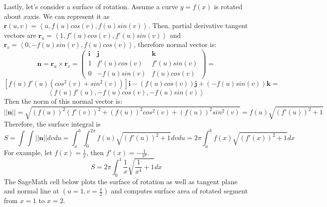 Lastly, let's consider a surface of rotation.   Assume a curve $y=f(x)$ is rotated about $x$\-axis.  We can represent it as $\mathbf{r}(u,v) = \left< u, f(u)cos(v), f(u)sin(v) \right>$.  
Then, partial derivative tangent vectors are $\mathbf{r}_u = \left< 1, f'(u)cos(v), f'(u)sin(v)  \right>$ and $\mathbf{r}_v = \left< 0, -f(u)sin(v), f(u)cos(v) \right>$, therefore normal vector is:
$$ \mathbf{n} = \mathbf{r}_u \times \mathbf{r}_v = \begin{pmatrix}
\mathbf{i} & \mathbf{j} & \mathbf{k}\\
1 & f'(u)cos(v) & f'(u)sin(v) \\
0 & -f(u)sin(v) & f(u)cos(v)
\end{pmatrix} = $$
$$[f(u)f'(u)(cos^2(v)+sin^2(v))] \mathbf{i}-(f(u)cos(v)) \mathbf{j} +(-f(u)sin(v)) \mathbf{k} =$$
$$ \left<  f(u)f'(u),-f(u)cos(v),-f(u)sin(v) \right>$$
Then the norm of this normal vector is:
$$||\mathbf{n}|| = \sqrt{ (f(u))^2(f'(v))^2+ (f(u))^2cos^2(v)+ (f(u))^2sin^2(v) } = f(u) \sqrt{ (f'(u))^2+ 1} $$
Therefore, the surface integral is
$$S =  \int\int || \mathbf{n} || dvdu =  \int_a^b\int_0^{2\pi} f(u) \sqrt{ (f'(u))^2+ 1} dvdu=  2\pi \int_a^b f(x) \sqrt{ (f'(x))^2+ 1} dx$$
For example, let $f(x)=\frac{1}{x}$, then $f'(x)=-\frac{1}{x^2}$.  
$$ S = 2\pi \int_0^1\frac{1}{x}\sqrt{ \frac{1}{x^4}+ 1}dx  $$The SageMath cell below plots the surface of rotation as well as tangent plane and normal line at $\left(u=1,v=\frac{\pi}{2}\right)$ and computes surface area of rotated segment from $x=1$ to $x=2$.

